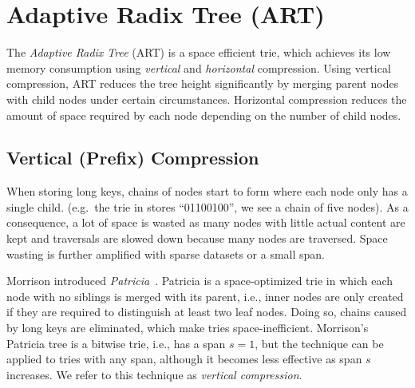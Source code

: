 \documentclass[abstracton,12pt]{scrartcl}
\theoremstyle{definition}
\begin{document}
\newpage

\section{Adaptive Radix Tree (ART)}\label{sec:art}

The \textit{Adaptive Radix Tree} (ART) is a space efficient trie, which
achieves its low memory consumption using \textit{vertical} and 
\textit{horizontal} compression. Using vertical compression, ART reduces
the tree height significantly by merging parent nodes with child nodes
under certain circumstances. Horizontal compression reduces the amount
of space required by each node depending on the number of child nodes.

\subsection{Vertical (Prefix) Compression}\label{sec:vertical-compression}

When storing long keys, chains of nodes start to form where each node only
has a single child. (e.g.\ the trie in  stores ``01100100'',
we see a chain of five nodes).
As a consequence, a lot of space is wasted as many nodes
with little actual content are kept and traversals are slowed down because
many nodes are traversed. Space wasting is further amplified with sparse
datasets or a small span.

Morrison introduced \textit{Patricia}~\cite{morrison1968patricia}. 
Patricia is a space-optimized trie in which
each node with no siblings is merged with its parent, i.e., inner nodes
are only created if they are required to distinguish at least two leaf nodes. 
Doing so, chains caused by long keys are eliminated, which make tries 
space-inefficient. Morrison's Patricia tree is a bitwise trie, i.e.,
has a span $s=1$, but the technique can be applied to tries with any span,
although it becomes less effective as span $s$ increases.
We refer to this technique as \textit{vertical compression}.
\end{document}
